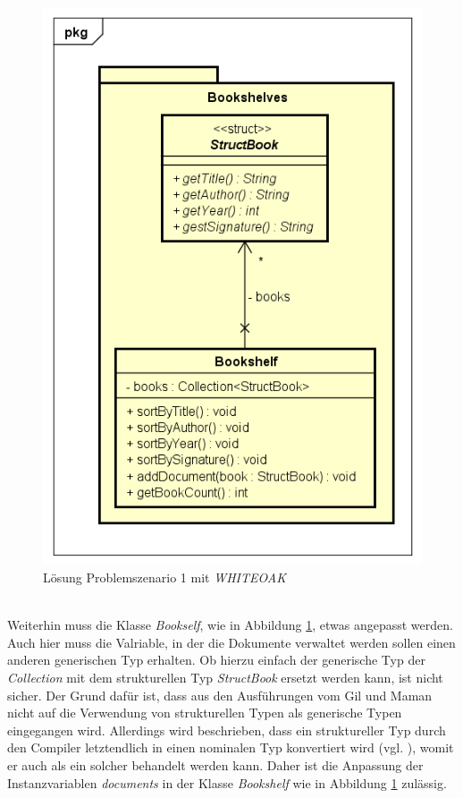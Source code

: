 \documentclass[11pt, 
ngerman,
doublespacing,
chapterinoneline, %
consistentlayout, %
]{scrartcl}
\begin{document}
\begin{figure}[h]
\centering
\includegraphics[scale=0.5]{pics/cd_loesungProlem1_whiteoak.png}
\caption{Lösung Problemszenario 1 mit \emph{WHITEOAK}  }
\label{cd_loesungProblem1_whiteoak}
\end{figure}\\
Weiterhin muss die Klasse \emph{Bookself}, wie in Abbildung \ref{cd_loesungProblem1_whiteoak}, etwas angepasst werden. Auch hier muss die Valriable, in der die Dokumente verwaltet werden sollen einen anderen generischen Typ erhalten. Ob hierzu einfach der generische Typ der \emph{Collection} mit dem strukturellen Typ \emph{StructBook} ersetzt werden kann, ist nicht sicher. Der Grund dafür ist, dass aus den Ausführungen vom Gil und Maman \cite{whiteoak} nicht auf die Verwendung von strukturellen Typen als generische Typen eingegangen wird. Allerdings wird beschrieben, dass ein struktureller Typ durch den Compiler letztendlich in einen nominalen Typ konvertiert wird (vgl. \cite{whiteoak}), womit er auch als ein solcher behandelt werden kann. Daher ist die Anpassung  der Instanzvariablen \emph{documents} in der Klasse \emph{Bookshelf} wie in Abbildung \ref{cd_loesungProblem1_whiteoak} zulässig.
\end{document}
